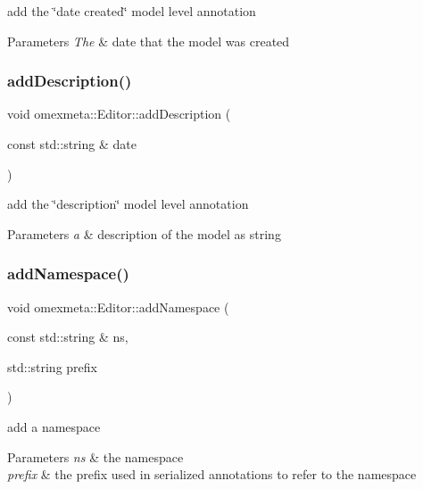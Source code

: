 add the \char`\"{}date created\char`\"{} model level annotation 


\begin{DoxyParams}{Parameters}
{\em The} & date that the model was created \\
\hline
\end{DoxyParams}
\mbox{\label{classomexmeta_1_1Editor_a8526a87544b1265695f1749100da5fa2}} 
\subsubsection{\texorpdfstring{add\+Description()}{addDescription()}}
{\footnotesize\ttfamily void omexmeta\+::\+Editor\+::add\+Description (\begin{DoxyParamCaption}\item[{const std\+::string \&}]{date }\end{DoxyParamCaption})}



add the \char`\"{}description\char`\"{} model level annotation 


\begin{DoxyParams}{Parameters}
{\em a} & description of the model as string \\
\hline
\end{DoxyParams}
\mbox{\label{classomexmeta_1_1Editor_a052a725cee8b8e577c55e977eee81ace}} 
\subsubsection{\texorpdfstring{add\+Namespace()}{addNamespace()}}
{\footnotesize\ttfamily void omexmeta\+::\+Editor\+::add\+Namespace (\begin{DoxyParamCaption}\item[{const std\+::string \&}]{ns,  }\item[{std\+::string}]{prefix }\end{DoxyParamCaption})}



add a namespace 


\begin{DoxyParams}{Parameters}
{\em ns} & the namespace \\
\hline
{\em prefix} & the prefix used in serialized annotations to refer to the namespace \\
\hline
\end{DoxyParams}
\mbox{\label{classomexmeta_1_1Editor_ad7240613a1f3e215af6e4a05d121508c}} 
